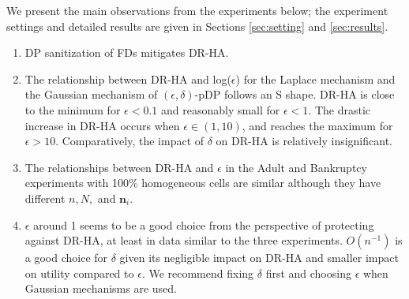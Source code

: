 \documentclass[10pt,journal,compsoc]{IEEEtran}
\newcommand{\n}{\mathbf{n}}
\begin{document}
We present the main observations from the experiments below; the experiment settings and detailed results are given in Sections \ref{sec:setting} and \ref{sec:results}. 
\begin{enumerate}[leftmargin=12pt, itemsep=-3pt]
\item DP sanitization of FDs mitigates DR-HA. 
\item The relationship between DR-HA and log($\epsilon$) for the Laplace mechanism and the Gaussian  mechanism of $(\epsilon,\delta)$-pDP follows an S shape. DR-HA is close to the minimum for $\epsilon\!<\!0.1$ and reasonably small for  $\epsilon\!<\!1$. The drastic increase in DR-HA occurs when $\epsilon\!\in\!(1,10)$, and reaches the maximum for $\epsilon\!>\!10$.  Comparatively, the impact of $\delta$ on DR-HA is relatively insignificant.
\item The relationships between  DR-HA and $\epsilon$ in the Adult and Bankruptcy experiments with 100\% homogeneous cells are similar although they have different $n,N,$ and $\n_i$. 
\item $\epsilon$ around 1 seems to be a good choice from the perspective of protecting against DR-HA, at least in data similar to the three experiments. $O(n^{-1})$ is a good choice for $\delta$ given its negligible impact on DR-HA and  smaller impact on utility compared to $\epsilon$. We recommend fixing $\delta$ first and choosing $\epsilon$ when Gaussian mechanisms are used.
\end{enumerate}
\end{document}
